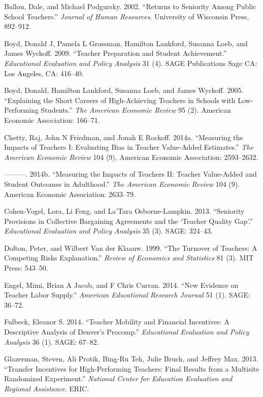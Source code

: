 \documentclass[]{article}
\begin{document}
\hypertarget{ref-ballou}{}
Ballou, Dale, and Michael Podgursky. 2002. ``Returns to Seniority Among
Public School Teachers.'' \emph{Journal of Human Resources}. University
of Wisconsin Press, 892--912.

\hypertarget{ref-boyd2009}{}
Boyd, Donald J, Pamela L Grossman, Hamilton Lankford, Susanna Loeb, and
James Wyckoff. 2009. ``Teacher Preparation and Student Achievement.''
\emph{Educational Evaluation and Policy Analysis} 31 (4). SAGE
Publications Sage CA: Los Angeles, CA: 416--40.

\hypertarget{ref-boyd2005}{}
Boyd, Donald, Hamilton Lankford, Susanna Loeb, and James Wyckoff. 2005.
``Explaining the Short Careers of High-Achieving Teachers in Schools
with Low-Performing Students.'' \emph{The American Economic Review} 95
(2). American Economic Association: 166--71.

\hypertarget{ref-chettyI}{}
Chetty, Raj, John N Friedman, and Jonah E Rockoff. 2014a. ``Measuring
the Impacts of Teachers I: Evaluating Bias in Teacher Value-Added
Estimates.'' \emph{The American Economic Review} 104 (9). American
Economic Association: 2593--2632.

\hypertarget{ref-chettyII}{}
---------. 2014b. ``Measuring the Impacts of Teachers II: Teacher
Value-Added and Student Outcomes in Adulthood.'' \emph{The American
Economic Review} 104 (9). American Economic Association: 2633--79.

\hypertarget{ref-cohenvogel}{}
Cohen-Vogel, Lora, Li Feng, and La'Tara Osborne-Lampkin. 2013.
``Seniority Provisions in Collective Bargaining Agreements and the
`Teacher Quality Gap'.'' \emph{Educational Evaluation and Policy
Analysis} 35 (3). SAGE: 324--43.

\hypertarget{ref-dolton}{}
Dolton, Peter, and Wilbert Van der Klaauw. 1999. ``The Turnover of
Teachers: A Competing Risks Explanation.'' \emph{Review of Economics and
Statistics} 81 (3). MIT Press: 543--50.

\hypertarget{ref-engel}{}
Engel, Mimi, Brian A Jacob, and F Chris Curran. 2014. ``New Evidence on
Teacher Labor Supply.'' \emph{American Educational Research Journal} 51
(1). SAGE: 36--72.

\hypertarget{ref-fulbeck}{}
Fulbeck, Eleanor S. 2014. ``Teacher Mobility and Financial Incentives: A
Descriptive Analysis of Denver's Procomp.'' \emph{Educational Evaluation
and Policy Analysis} 36 (1). SAGE: 67--82.

\hypertarget{ref-glazerman}{}
Glazerman, Steven, Ali Protik, Bing-Ru Teh, Julie Bruch, and Jeffrey
Max. 2013. ``Transfer Incentives for High-Performing Teachers: Final
Results from a Multisite Randomized Experiment.'' \emph{National Center
for Education Evaluation and Regional Assistance}. ERIC.
\end{document}
